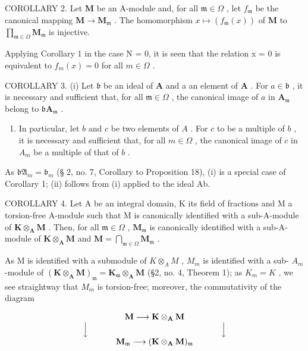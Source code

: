 COROLLARY 2. Let \(\mathbf{M}\) be an A-module and, for all \(\mathfrak{m} \in \Omega\) , let \(f_{\mathfrak{m}}\) be the canonical mapping \(\mathbf{M} \to \mathbf{M}_{\mathfrak{m}}\) . The homomorphism \(x \mapsto (f_{\mathfrak{m}}(x))\) of \(\mathbf{M}\) to \(\prod_{\mathfrak{m} \in \Omega} \mathbf{M}_{\mathfrak{m}}\) is injective.

Applying Corollary 1 in the case N = 0, it is seen that the relation x = 0 is equivalent to \(f_{m}(x) = 0\) for all \(m \in \Omega\) .

COROLLARY 3. (i) Let \(\mathfrak{b}\) be an ideal of \(\mathbf{A}\) and a an element of \(\mathbf{A}\) . For \(a \in \mathfrak{b}\) , it is necessary and sufficient that, for all \(\mathfrak{m} \in \Omega\) , the canonical image of \(a\) in \(\mathbf{A}_{\mathfrak{m}}\) belong to \(\mathfrak{b}\mathbf{A}_{\mathfrak{m}}\) .

\begin{enumerate}
\def\labelenumi{(\roman{enumi})}
\setcounter{enumi}{1}
\tightlist
\item
  In particular, let \(b\) and \(c\) be two elements of \(A\) . For \(c\) to be a multiple of \(b\) , it is necessary and sufficient that, for all \(m \in \Omega\) , the canonical image of \(c\) in \(A_m\) be a multiple of that of \(b\) .
\end{enumerate}

As \(\mathfrak{bA}_{m} = \mathfrak{b}_{m}\) (§ 2, no. 7, Corollary to Proposition 18), (i) is a special case of Corollary 1; (ii) follows from (i) applied to the ideal Ab.

COROLLARY 4. Let A be an integral domain, K its field of fractions and M a torsion-free A-module such that M is canonically identified with a sub-A-module of \(\mathbf{K} \otimes_{\mathbf{A}} \mathbf{M}\) . Then, for all \(\mathfrak{m} \in \Omega\) , \(\mathbf{M}_{\mathfrak{m}}\) is canonically identified with a sub-A-module of \(\mathbf{K} \otimes_{\mathbf{A}} \mathbf{M}\) and \(\mathbf{M} = \bigcap_{\mathfrak{m} \in \Omega} \mathbf{M}_{\mathfrak{m}}\) .

As M is identified with a submodule of \(K \otimes_{A} M\) , \(M_{m}\) is identified with a sub- \(A_{m}\) -module of \((\mathbf{K} \otimes_{\mathbf{A}} \mathbf{M})_{\mathfrak{m}} = \mathbf{K}_{\mathfrak{m}} \otimes_{\mathbf{A}} \mathbf{M}\) (§2, no. 4, Theorem 1); as \(K_{m} = K\) , we see straightway that \(M_{m}\) is torsion-free; moreover, the commutativity of the diagram

\[
\begin{array}{c} \mathbf {M} \longrightarrow \mathbf {K} \otimes_ {\mathbf {A}} \mathbf {M} \\ \Big \downarrow \qquad \qquad \qquad \qquad \qquad \qquad \qquad \qquad \Big \downarrow \\ \mathbf {M} _ {\mathfrak {m}} \longrightarrow (\mathbf {K} \otimes_ {\mathbf {A}} \mathbf {M}) _ {\mathfrak {m}} \end{array}
\]

